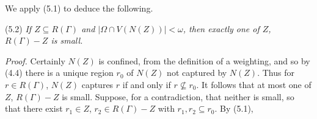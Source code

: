 We apply (5.1) to deduce the following.

\stmt
(5.2) \textit{If $Z \subseteq R(\Gamma)$ and $|\Omega \cap V(N(Z))| < \omega$, then exactly one of $Z$, $R(\Gamma) - Z$ is small.}

\textit{Proof.} Certainly $N(Z)$ is confined, from the definition of a weighting, and so by (4.4) there is a unique region $r_0$ of $N(Z)$ not captured by $N(Z)$. Thus for $r \in R(\Gamma)$, $N(Z)$ captures $r$ if and only if $r \not\subseteq r_0$. It follows that at most one of $Z$, $R(\Gamma) - Z$ is small. Suppose, for a contradiction, that neither is small, so that there exist $r_1 \in Z$, $r_2 \in R(\Gamma) - Z$ with $r_1, r_2 \subseteq r_0$. By (5.1),
